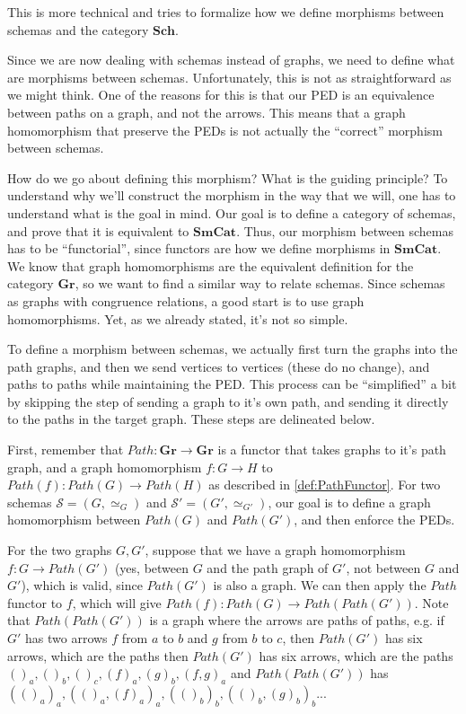 This is more technical and tries to formalize how we define morphisms between schemas and
the category $\mathbf{Sch}$.

Since we are now dealing with schemas instead of graphs, we need to define what are morphisms
between schemas. Unfortunately, this is not as straightforward as we might think. One of the reasons
for this is that our PED is an equivalence between paths on a graph, and not the arrows.
This means that a graph homomorphism that preserve the PEDs is not actually the ``correct''
morphism between schemas.

How do we go about defining this morphism? What is the guiding principle? To understand why
we'll construct the morphism in the way that we will, one has to understand what is the goal in mind.
Our goal is to define a category of schemas, and prove that it is equivalent to $\mathbf{SmCat}$.
Thus, our morphism between schemas has to be ``functorial'', since functors are how we define
morphisms in $\mathbf{SmCat}$. We know that graph homomorphisms are the equivalent definition
for the category $\mathbf{Gr}$, so we want to find a similar way to relate schemas.
Since schemas as graphs with congruence relations, a good start is to use graph homomorphisms.
Yet, as we already stated, it's not so simple.

To define a morphism between schemas, we actually first turn the graphs
into the path graphs, and then we send vertices to vertices (these do no change), and
paths to paths while maintaining the PED. This process can be ``simplified'' a bit
by skipping the step of sending a graph to it's own path, and sending it
directly to the paths in the target graph. These steps are delineated below.

First, remember that $Path:\mathbf{Gr} \to \mathbf{Gr}$ is a functor that takes
graphs to it's path graph, and a graph homomorphism $f:G\to H$ to $Path(f):Path(G) \to Path(H)$
as described in \ref{def:PathFunctor}.
For two schemas $\mathcal S = (G,\simeq_G)$ and $\mathcal S' = (G', \simeq_{G'})$,
our goal is to define a graph homomorphism between $Path(G)$ and $Path(G')$,
and then enforce the PEDs.

For the two graphs $G, G'$, suppose that we have
a graph homomorphism $f: G \to Path(G')$ (yes, between $G$ and the path graph of $G'$,
not between $G$ and $G'$), which is valid, since $Path(G')$ is also a graph.
We can then apply the $Path$ functor to $f$, which will give
$Path(f):Path(G) \to Path(Path(G'))$. Note that $Path(Path(G'))$ is a graph where
the arrows are paths of paths, e.g. if $G'$ has two arrows $f$ from $a$ to $b$ and
$g$ from $b$ to $c$, then $Path(G')$ has six arrows, which are the paths
then $Path(G')$ has six arrows, which are the paths
$()_a, ()_b, ()_c, (f)_a, (g)_b, (f,g)_a$ and $Path(Path(G'))$ has
$(()_a)_a, (()_a,(f)_a)_a, (()_b)_b, (()_b,(g)_b)_b ...$

